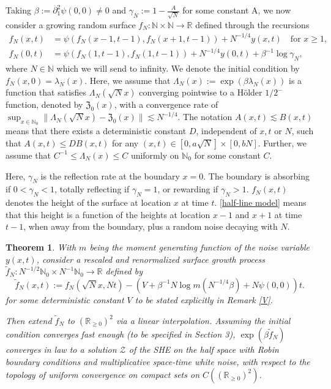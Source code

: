 \documentclass[10pt]{article}
\newtheorem{theorem}{Theorem}[section]
\begin{document}
Taking $\beta:=\partial_{1}^{2} \psi(0,0) \neq 0$ and  $\gamma_N:=1-\frac{A}{\sqrt{N}}$ for some constant A, we now consider a growing random surface $f_{N}: \mathbb{N} \times \mathbb{N} \rightarrow \mathbb{R}$ defined through the recursions
\begin{align} \label{half-line model}
    f_{N}(x, t)&=\psi\left(f_{N}(x-1, t-1), f_{N}(x+1, t-1)\right)+N^{-1 / 4} y(x, t) \quad \text{for } x\geq 1,\\
    f_{N}(0, t)&=\psi\left(f_{N}(1, t-1), f_{N}(1, t-1)\right)+N^{-1 / 4} y(0, t)+\beta^{-1}\log\gamma_N,
\end{align}
where $N\in \mathbb{N}$ which we will send to infinity. We denote the initial condition by $f_{N}(x, 0)=\lambda_N(x)$. Here, we assume that $\Lambda_N(x):=\exp(\beta\lambda_N(x))$ is a function that satisfies $\Lambda_N(\sqrt{N}x)$ converging pointwise to a Hölder $1/2^-$ function, denoted by $\mathfrak{Z}_0(x)$, with a convergence rate of $\sup_{x \in \mathbb{N}_0}\|\Lambda_N(\sqrt{N}x)-\mathfrak{Z}_0(x)\| \lesssim N^{-1/4}$. The notation $A(x,t)\lesssim B(x,t)$ means that there exists a deterministic constant $D$, independent of $x, t$ or $N$, such that $A(x,t)\leq DB(x,t)$ for any $(x,t) \in [0, a\sqrt{N}]
 \times [0, bN]$. Further, we assume that $C^{-1} \leq \Lambda_N(x) \leq C$ uniformly on $\mathbb{N}_0$ for some constant $C$.


Here, $\gamma_N$ is the reflection rate at the boundary $x=0$. The boundary is absorbing if $0<\gamma_N<1$, totally reflecting if $\gamma_N=1$, or rewarding if $\gamma_N>1$. $f_{N}(x, t)$ denotes the height of the surface at location $x$ at time $t$. \eqref{half-line model} means that this height is a function of the heights at location $x-1$ and $x+1$ at time $t-1$, when away from the boundary, plus a random noise decaying with $N$. 


\begin{theorem}\label{mainresult}
With $m$ being the moment generating function of the noise variable $y(x,t)$, consider a rescaled and renormalized surface growth process $\widetilde{f}_{N}: N^{-1/2}\mathbb{N}_0 \times N^{-1}\mathbb{N}_0 \rightarrow \mathbb{R}$ defined by 
\begin{equation}\label{def2}
\widetilde{f}_{N}(x, t):=f_{N}(\sqrt{N} x, N t)-(V+\beta^{-1}N\log m(N^{-1 / 4} \beta)+N \psi(0,0)) t.
\end{equation}
for some deterministic constant $V$ to be stated explicitly in Remark \ref{V}.

Then extend $\widetilde{f}_{N}$ to $(\mathbb{R}_{\geq 0})^2$ via a linear interpolation. Assuming the initial condition converges fast enough (to be specified in Section 3), $\exp (\beta \widetilde{f}_{N})$ converges in law to a solution $\mathcal{Z}$ of the SHE on the half space with Robin boundary conditions and multiplicative space-time white noise, with respect to the topology of uniform convergence on compact sets on $C((\mathbb{R}_{\geq 0})^2)$.


\end{theorem}
\end{document}
